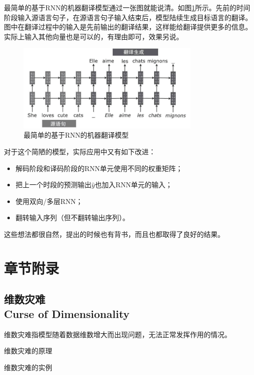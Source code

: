最简单的基于RNN的机器翻译模型通过一张图就能说清。如图\ref{05-rnn-nmt}所示。先前的时间阶段输入源语言句子，在源语言句子输入结束后，模型陆续生成目标语言的翻译。
图中在翻译过程中的输入是先前输出的翻译结果，这样能给翻译提供更多的信息。实际上输入其他向量也是可以的，有理由即可，效果另说。

\begin{figure}[!htbp]
\centering
\includegraphics[width=0.8\textwidth]{chap-05/05-rnn-nmt.png}
\caption{最简单的基于RNN的机器翻译模型}
\label{05-rnn-nmt}
\end{figure}

对于这个简陋的模型，实际应用中又有如下改进：

\begin{itemize}
    \item 解码阶段和译码阶段的RNN单元使用不同的权重矩阵；
    \item 把上一个时段的预测输出$\hat{y}$也加入RNN单元的输入；
    \item 使用双向/多层RNN；
    \item 翻转输入序列（但不翻转输出序列）。
\end{itemize}

这些想法都很自然，提出的时候也有背书，而且也都取得了良好的结果。

\section{章节附录}

\subsection{维数灾难 \\ Curse of Dimensionality}
\label{curse}

维数灾难指模型随着数据维数增大而出现问题，无法正常发挥作用的情况。

维数灾难的原理

维数灾难的实例

